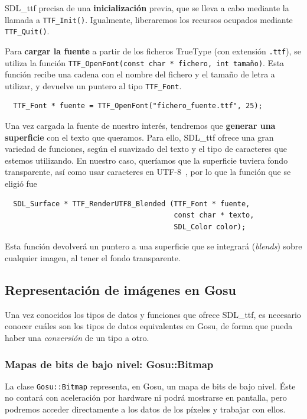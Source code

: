 SDL\_ttf precisa de una \textbf{inicialización} previa, que se lleva a cabo mediante la
llamada a \texttt{TTF\_Init()}. Igualmente, liberaremos los recursos ocupados
mediante \texttt{TTF\_Quit()}.

Para \textbf{cargar la fuente} a partir de los ficheros TrueType (con extensión
\texttt{.ttf}), se utiliza la función \texttt{TTF\_OpenFont(const char * fichero,
  int tamaño)}. Esta función recibe una cadena con el nombre del fichero y el
tamaño de letra a utilizar, y devuelve un puntero al tipo \texttt{TTF\_Font}.

\begin{verbatim}
  TTF_Font * fuente = TTF_OpenFont("fichero_fuente.ttf", 25);
\end{verbatim}

Una vez cargada la fuente de nuestro interés, tendremos que \textbf{generar una
  superficie} con el texto que queramos. Para ello, SDL\_ttf ofrece una gran
variedad de funciones, según el suavizado del texto y el tipo de caracteres que
estemos utilizando. En nuestro caso, queríamos que la superficie tuviera fondo
transparente, así como usar caracteres en UTF-8~\cite{refutf8}, por lo que la
función que se eligió fue 
\begin{verbatim}
  SDL_Surface * TTF_RenderUTF8_Blended (TTF_Font * fuente,
                                        const char * texto,
                                        SDL_Color color);
\end{verbatim}

Esta función devolverá un puntero a una superficie que se integrará
(\textit{blends}) sobre cualquier imagen, al tener el fondo transparente.


\subsection{Representación de imágenes en Gosu}

Una vez conocidos los tipos de datos y funciones que ofrece SDL\_ttf, es
necesario conocer cuáles son los tipos de datos equivalentes en Gosu, de forma
que pueda haber una \textit{conversión} de un tipo a otro.

\subsubsection{Mapas de bits de bajo nivel: Gosu::Bitmap}
La clase \texttt{Gosu::Bitmap} representa, en Gosu, un mapa de bits de bajo
nivel. Éste no contará con aceleración por hardware ni podrá mostrarse en
pantalla, pero podremos acceder directamente a los datos de los píxeles y
trabajar con ellos.

